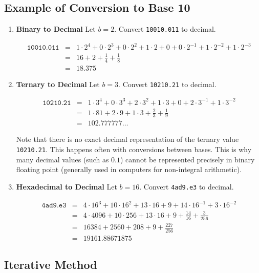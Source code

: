 \documentclass[12pt]{article}
\begin{document}
\subsection*{Example of Conversion to Base 10}

\begin{enumerate}
  \item{\textbf{Binary to Decimal}}
    Let $b = 2$.  Convert \verb!10010.011! to decimal.

\begin{eqnarray*}
\texttt{10010.011}&=&1\cdot2^4+0\cdot2^3+0\cdot2^2+1\cdot2+0+0\cdot2^{-1}+1\cdot2^{-2}+1\cdot2^{-3}\\
&=&16+2+\frac{1}{4}+\frac{1}{8}\\
&=&18.375
\end{eqnarray*}

  \item{\textbf{Ternary to Decimal}}
    Let $b = 3$.  Convert \verb!10210.21! to decimal.

\begin{eqnarray*}
\texttt{10210.21}&=&1\cdot3^4+0\cdot3^3+2\cdot3^2+1\cdot3+0+2\cdot3^{-1}+1\cdot3^{-2}\\
&=&1\cdot81+2\cdot9+1\cdot3+\frac{2}{3}+\frac{1}{9}\\
&=&102.777777\dots
\end{eqnarray*}

Note that there is no exact decimal representation of the ternary value \verb!10210.21!.  This happens often with conversions between bases.  This is why many decimal values (such as $0.1$) cannot be represented precisely in binary floating point (generally used in computers for non-integral arithmetic).

\item{\textbf{Hexadecimal to Decimal}}
Let $b = 16$.  Convert \verb!4ad9.e3! to decimal.

\begin{eqnarray*}
\texttt{4ad9.e3}&=&4\cdot16^3+10\cdot16^2+13\cdot16+9+14\cdot16^{-1}+3\cdot16^{-2}\\
&=&4\cdot4096+10\cdot256+13\cdot16+9+\frac{14}{16}+\frac{3}{256}\\
&=&16384+2560+208+9+\frac{227}{256}\\
&=&19161.88671875
\end{eqnarray*}
\end{enumerate}

\subsection*{Iterative Method}
\end{document}
